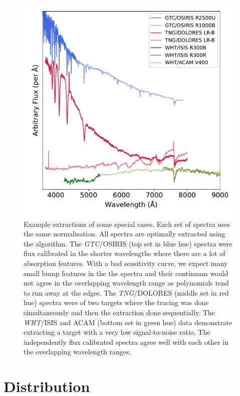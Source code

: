 \documentclass[linenumbers, twocolumn]{aastex631}
\begin{document}
\begin{figure}
    \centering
    \includegraphics[width=\columnwidth]{fig_09_use_case_plots.pdf}
    \caption{Example extractions of some special cases. Each set of spectra
    uses the same normalisation. All spectra are optimally extracted using the
    \citet{1986PASP...98..609H} algorithm. The \textit{GTC}/OSIRIS (top set in blue hue)
    spectra were flux calibrated in the shorter wavelengths where there are a
    lot of absorption features. With a bad sensitivity curve, we expect many
    small bump features in the the spectra and their continuum would not agree
    in the overlapping wavelength range as polynomials tend to run away at the
    edges. The \textit{TNG}/DOLORES (middle set in red hue) spectra were of two targets where
    the tracing was done simultaneously and then the extraction done
    sequentially. The \textit{WHT}/ISIS and ACAM (bottom set in green hue) data demonstrate
    extracting a target with a very low signal-to-noise ratio. The independently
    flux calibrated spectra agree well with each other in the overlapping
    wavelength ranges.}
    \label{fig:use_cases}
\end{figure}

\section{Distribution}
\label{sec:distribution}
\end{document}

